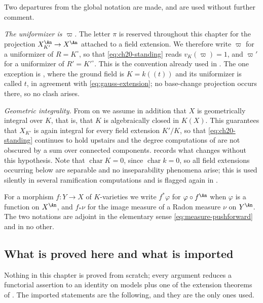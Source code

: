 Two departures from the global notation are made, and are used without
further comment.

\emph{The uniformizer is \(\varpi\).}  The letter \(\pi\) is reserved
throughout this chapter for the projection \(X_{K'}^{\An}\to X^{\An}\)
attached to a field extension.  We therefore write \(\varpi\) for a
uniformizer of \(R=K^\circ\), so that \eqref{eq:ch20-standing} reads
\(v_K(\varpi)=1\), and \(\varpi'\) for a uniformizer of \(R'=K'^\circ\).
This is the convention already used in
.  The one
exception is , where the ground field is
\(K=k(\!(t)\!)\) and its uniformizer is called \(t\), in agreement with
\eqref{eq:gauss-extension}; no base-change projection occurs there, so no
clash arises.

\emph{Geometric integrality.}  From  on we assume
in addition that \(X\) is geometrically integral over \(K\), that is, that
\(K\) is algebraically closed in \(K(X)\).  This guarantees that \(X_{K'}\)
is again integral for every field extension \(K'/K\), so that
\eqref{eq:ch20-standing} continues to hold upstairs and the degree
computations of  are not obscured by a sum over
connected components.   records
what changes without this hypothesis.  Note that \(\operatorname{char}K=0\),
since \(\operatorname{char}k=0\), so all field extensions occurring below are
separable and no inseparability phenomena arise; this is used silently in
several ramification computations and is flagged again in
.

For a morphism \(f:Y\to X\) of \(K\)-varieties we write \(f^*\varphi\) for
\(\varphi\circ f^{\An}\) when \(\varphi\) is a function on \(X^{\An}\), and
\(f_*\nu\) for the image measure of a Radon measure \(\nu\) on \(Y^{\An}\).
The two notations are adjoint in the elementary sense
\eqref{eq:measure-pushforward} and in no other.

\subsection{What is proved here and what is imported}
\label{sec:ch30-imported}

Nothing in this chapter is proved from scratch; every argument reduces a
functorial assertion to an identity on models plus one of the extension
theorems of .  The imported
statements are the following, and they are the only ones used.

